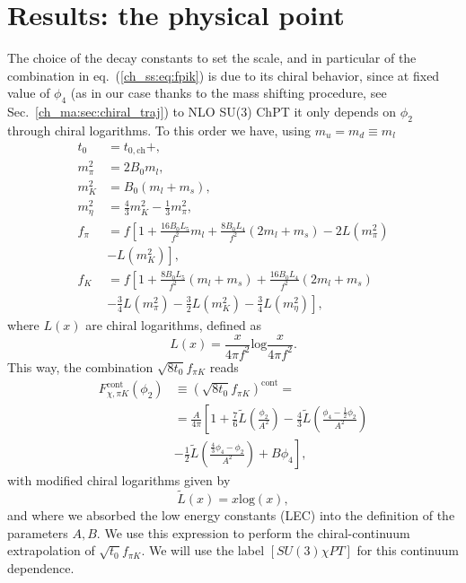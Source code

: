 \section{Results: the physical point}
\label{ch_ss:sec:Results}

The choice of the decay constants to set the scale, and in particular of the combination in eq.~(\ref{ch_ss:eq:fpik}) is due to its chiral behavior, since at fixed value of $\phi_4$ (as in our case thanks to the mass shifting procedure, see Sec.~\ref{ch_ma:sec:chiral_traj}) to NLO SU(3) ChPT it only depends on $\phi_2$ through chiral logarithms. To this order we have, using $m_u=m_d\equiv m_l$
\begin{align}
t_0&=t_{0,\textrm{ch}}+ , \\
m_{\pi}^2&=2B_0m_l, \\
m_K^2&=B_0(m_l+m_s), \\
m_{\eta}^2&=\frac{4}{3}m_K^2-\frac{1}{3}m_{\pi}^2, \\
f_{\pi}&=f\left[1+\frac{16B_0L_5}{f^2}m_l+\frac{8B_0L_4}{f^2}(2m_l+m_s)-2L(m_{\pi}^2)\right. \\
&\left.-L(m_K^2)\right], \\
f_K&=f\left[1+\frac{8B_0L_5}{f^2}(m_l+m_s)+\frac{16B_0L_4}{f^2}(2m_l+m_s)\right. \\
&\left.-\frac{3}{4}L(m_{\pi}^2)-\frac{3}{2}L(m_K^2)-\frac{3}{4}L(m_{\eta}^2)\right],
\end{align}
where $L(x)$ are chiral logarithms, defined as
\begin{equation}
L(x)=\frac{x}{4\pi f^2}\textrm{log}\frac{x}{4\pi f^2}.
\end{equation}
This way, the combination $\sqrt{8t_0}f_{\pi K}$ reads
\begin{align}
\label{ch_ss:eq:SU3ChPT}
F_{\chi,\pi K}^{\textrm{cont}}(\phi_2)&\equiv\left(\sqrt{8t_0}f_{\pi K}\right)^{\textrm{cont}}=\\
&=\frac{A}{4\pi}\left[1+\frac{7}{6}\tilde{L}\left(\frac{\phi_2}{A^2}\right)-\frac{4}{3}\tilde{L}\left(\frac{\phi_4-\frac{1}{2}\phi_2}{A^2}\right)\right. \\
&\left.-\frac{1}{2}\tilde{L}\left(\frac{\frac{4}{3}\phi_4-\phi_2}{A^2}\right)+B\phi_4\right],
\end{align}
with modified chiral logarithms given by
\begin{equation}
\label{ch_ss:eq:log}
\tilde{L}(x)=x{\textrm{log}}\left(x\right),
\end{equation}
and where we absorbed the low energy constants (LEC) into the definition of the parameters $A,B$. We use this expression to perform the chiral-continuum extrapolation of $\sqrt{t_0}f_{\pi K}$. We will use the label $[SU(3)\chi PT]$ for this continuum dependence. 

